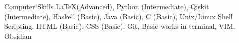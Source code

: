 \begin{rubric}{Computer Skills}
\entry*[Languages] \LaTeX (Advanced), Python (Intermediate), Qiskit (Intermediate), Haskell (Basic), Java (Basic), C (Basic), Unix/Linux Shell Scripting, HTML (Basic), CSS (Basic).
\entry*[Tools] Git, Basic works in terminal, VIM, Obsidian
\end{rubric}